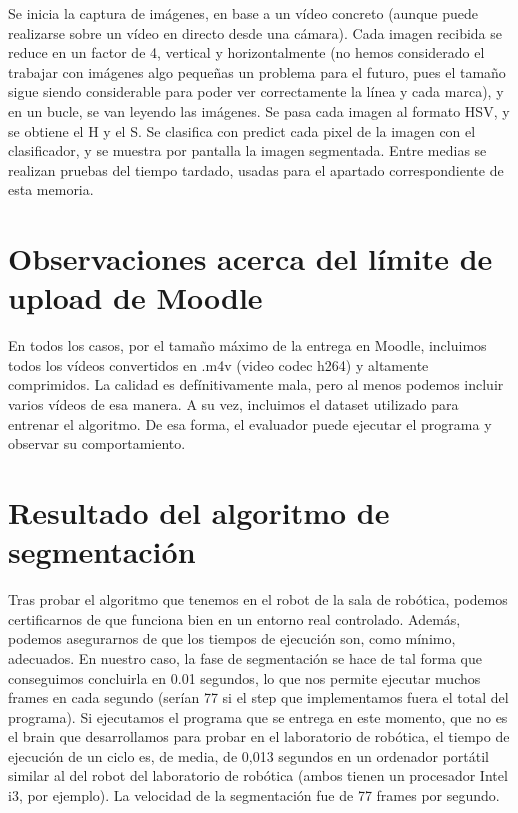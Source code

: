 \documentclass{article}
\begin{document}
	Se inicia la captura de imágenes, en base a un vídeo concreto (aunque puede realizarse sobre un vídeo en directo desde una cámara). Cada imagen recibida se reduce en un factor de 4, vertical y horizontalmente (no hemos considerado el trabajar con imágenes algo pequeñas un problema para el futuro, pues el tamaño sigue siendo considerable para poder ver correctamente la línea y cada marca), y en un bucle, se van leyendo las imágenes. Se pasa cada imagen al formato HSV, y se obtiene el H y el S. Se clasifica con predict cada pixel de la imagen con el clasificador, y se muestra por pantalla la imagen segmentada. Entre medias se realizan pruebas del tiempo tardado, usadas para el apartado correspondiente de esta memoria.

\section{Observaciones acerca del límite de upload de Moodle}
	En todos los casos, por el tamaño máximo de la entrega en Moodle, incluimos todos los vídeos convertidos en .m4v (video codec h264) y altamente comprimidos. La calidad es defínitivamente mala, pero al menos podemos incluir varios vídeos de esa manera. A su vez, incluimos el dataset utilizado para entrenar el algoritmo. De esa forma, el evaluador puede ejecutar el programa y observar su comportamiento.

\section{Resultado del algoritmo de segmentación}
	Tras probar el algoritmo que tenemos en el robot de la sala de robótica, podemos certificarnos de que funciona bien en un entorno real controlado. Además, podemos asegurarnos de que los tiempos de ejecución son, como mínimo, adecuados. En nuestro caso, la fase de segmentación se hace de tal forma que conseguimos concluirla en 0.01 segundos, lo que nos permite ejecutar muchos frames en cada segundo (serían 77 si el step que implementamos fuera el total del programa). Si ejecutamos el programa que se entrega en este momento, que no es el brain que desarrollamos para probar en el laboratorio de robótica, el tiempo de ejecución de un ciclo es, de media, de 0,013 segundos en un ordenador portátil similar al del robot del laboratorio de robótica (ambos tienen un procesador Intel i3, por ejemplo). La velocidad de la segmentación fue de 77 frames por segundo.
\end{document}

